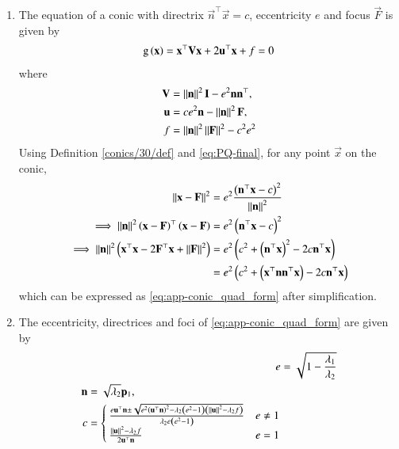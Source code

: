 \begin{enumerate}[label=\thesubsection.\arabic*.,ref=\thesubsection.\theenumi]
\item
The equation of  a conic with directrix $\vec{n}^{\top}\vec{x} = c$, eccentricity $e$ and focus $\vec{F}$ is given by 
\begin{align}
    \label{eq:app-conic_quad_form}
	\text{g}\left(\mathbf{x}\right) = \mathbf{x}^{\top}\mathbf{V}\mathbf{x}+2\mathbf{u}^{\top}\mathbf{x}+f=0
    \end{align}
where     
\begin{align}
  \label{eq:app-conic_quad_form_v}
\mathbf{V} &=\left\lVert\mathbf{n}\right\rVert^2\mathbf{I}-e^2\mathbf{n}\mathbf{n}^{\top}, 
\\
\label{eq:app-conic_quad_form_u}
\mathbf{u} &= ce^2\mathbf{n}-\left\lVert\mathbf{n}\right\rVert^2\mathbf{F}, 
\\
\label{eq:app-conic_quad_form_f}
f &= \left\lVert\mathbf{n}\right\rVert^2\left\lVert\mathbf{F}\right\rVert^2-c^2e^2
    \end{align}
    \solution
  Using Definition \ref{conics/30/def} and 
			\eqref{eq:PQ-final},
for any point $\vec{x}$ on the conic,
\begin{align}
	\left\lVert\mathbf{x}-\mathbf{F}\right\rVert^2&=e^2 \frac{\left({\mathbf{n}^{\top}\mathbf{x} - c}\right)^2}{\left\lVert\mathbf{n}\right\rVert^2}\label{conics/30/eq:1} \\
	\implies \left\lVert\mathbf{n}\right\rVert^2\left(\mathbf{x}-\mathbf{F}\right)^{\top}\left(\mathbf{x}-\mathbf{F}\right)&=e^2\left(\mathbf{n}^{\top}\mathbf{x} - c\right)^2
\\
\implies \left\lVert\mathbf{n}\right\rVert^2\left(\mathbf{x}^{\top}\mathbf{x}-2\mathbf{F}^{\top}\mathbf{x}+\left\lVert\mathbf{F}\right\rVert^2\right)
	&=e^2\left(c^2+\left(\mathbf{n}^{\top}\mathbf{x} \right)^2-2c\mathbf{n}^{\top}\mathbf{x}\right) \\
	&=e^2\left(c^2+\left(\mathbf{x}^{\top}\mathbf{n}\mathbf{n}^{\top}\mathbf{x} \right)-2c\mathbf{n}^{\top}\mathbf{x}\right)
\end{align}
%
which can be expressed as \eqref{eq:app-conic_quad_form} after simplification.
\item
  The eccentricity, directrices and foci of \eqref{eq:app-conic_quad_form} are given by 
\begin{align}
  \label{eq:app-conic_quad_form_e} 
  e&= \sqrt{1-\frac{\lambda_1}{\lambda_2}}
\\
\label{eq:app-conic_quad_form_nc} 
	\begin{split}
  \mathbf{n}&= \sqrt{\lambda_2}\mathbf{p}_1,  
  \\
	c &= 
  \begin{cases}
    \frac{e\mathbf{u}^{\top}\mathbf{n} \pm \sqrt{e^2\left(\mathbf{u}^{\top}\mathbf{n}\right)^2-\lambda_2\left(e^2-1\right)\left(\left\lVert\mathbf{u}\right\rVert^2 - \lambda_2 f\right)}}{\lambda_2e\left(e^2-1\right)} & e \ne 1
    \\
    \frac{\left\lVert\mathbf{u}\right\rVert^2 - \lambda_2 f   }{2\mathbf{u}^{\top}\mathbf{n}} & e = 1

\end{cases}
\end{split}
\end{align}
\end{enumerate}
